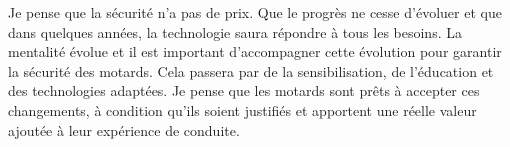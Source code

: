 Je pense que la sécurité n'a pas de prix. Que le progrès ne cesse d'évoluer et que dans quelques années, la technologie saura répondre à tous les besoins. La mentalité évolue et il est important d'accompagner cette évolution pour garantir la sécurité des motards. Cela passera par de la sensibilisation, de l'éducation et des technologies adaptées. Je pense que les motards sont prêts à accepter ces changements, à condition qu'ils soient justifiés et apportent une réelle valeur ajoutée à leur expérience de conduite.